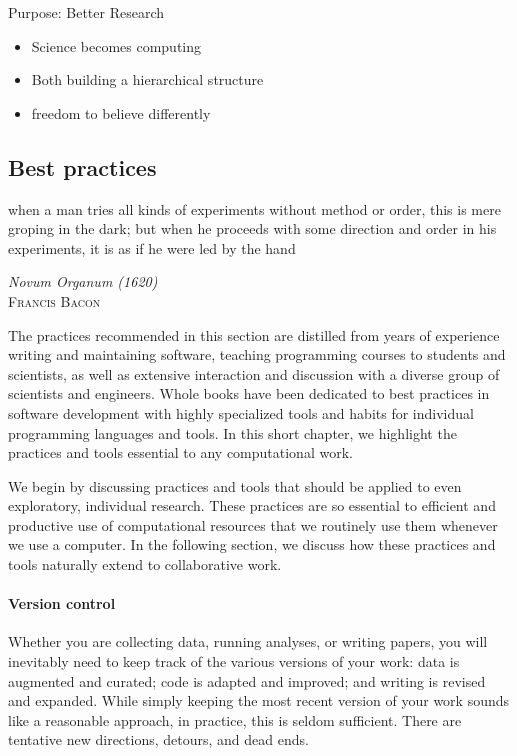 \documentclass[ChapterTOCs,krantz2]{krantz} %
\begin{document}
Purpose:  Better Research

\begin{itemize}
\item Science becomes computing
\item Both building a hierarchical structure
\item freedom to believe differently
\end{itemize}




\subsection{Best practices}

\setlength{\epigraphrule}{0pt}
\setlength{\epigraphwidth}{.90\textwidth}
\epigraph%
{%
  when a man tries all kinds of experiments without method or
  order, this is mere groping in the dark; but when he proceeds with
  some direction and order in his experiments, it is as if he were
  led by the hand
}%
{\textit{Novum Organum (1620)}\\ \textsc{Francis Bacon} }

The practices recommended in this section are distilled from years of
experience writing and maintaining software, teaching programming courses to
students and scientists, as well as extensive interaction and discussion with a
diverse group of scientists and engineers.  Whole books have been dedicated to
best practices in software development with highly specialized tools and habits
for individual programming languages and tools.  In this short chapter, we
highlight the practices and tools essential to any computational work.

We begin by discussing practices and tools that should be applied to even
exploratory, individual research.  These practices are so essential to
efficient and productive use of computational resources that we routinely use
them whenever we use a computer. In the following section, we discuss how these
practices and tools naturally extend to collaborative work. 

\paragraph{ {\bf Version control}}

Whether you are collecting data, running analyses, or writing papers,
you will inevitably need to keep track of the various versions of your work:
data is augmented and curated; code is adapted and improved; and writing is
revised and expanded.  While simply keeping the most recent version of your
work sounds like a reasonable approach, in practice, this is seldom sufficient.
There are tentative new directions, detours, and dead ends.
\end{document}
